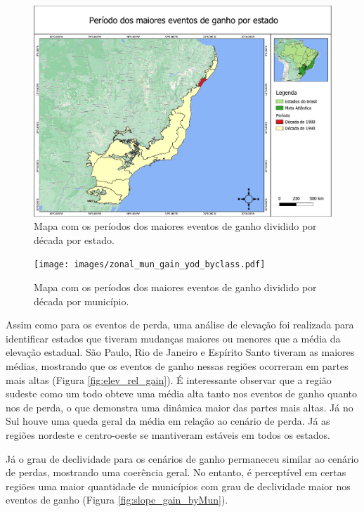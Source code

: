 \begin{figure}[H]
    \centering
    \includegraphics[scale=.5]{images/zonal_gain_yod_byclass.pdf}
    \caption{Mapa com os períodos dos maiores eventos de ganho dividido por década por estado.}
    \label{fig:zonal_gain_yod_byclass}
\end{figure}

\begin{figure}[H]
    \centering
    \texttt{[image: images/zonal\_mun\_gain\_yod\_byclass.pdf]}
    \caption{Mapa com os períodos dos maiores eventos de ganho dividido por década por município.}
    \label{fig:zonal_mun_gain_yod_byclass}
\end{figure}

Assim como para os eventos de perda, uma análise de elevação foi realizada para identificar estados que tiveram mudanças maiores ou menores que a média da elevação estadual. São Paulo, Rio de Janeiro e Espírito Santo tiveram as maiores médias, mostrando que os eventos de ganho nessas regiões ocorreram em partes mais altas (Figura \ref{fig:elev_rel_gain}). É interessante observar que a região sudeste como um todo obteve uma média alta tanto nos eventos de ganho quanto nos de perda, o que demonstra uma dinâmica maior das partes mais altas. Já no Sul houve uma queda geral da média em relação ao cenário de perda. Já as regiões nordeste e centro-oeste se mantiveram estáveis em todos os estados. 

Já o grau de declividade para os cenários de ganho permaneceu similar ao cenário de perdas, mostrando uma coerência geral. No entanto, é perceptível em certas regiões uma maior quantidade de municípios com grau de declividade maior nos eventos de ganho (Figura \ref{fig:slope_gain_byMun}).

